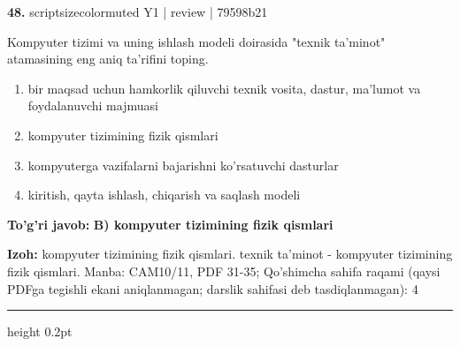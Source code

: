 \documentclass[10pt,a4paper]{article}
\begin{document}
{\bfseries\sffamily\color{ink} 48.} {scriptsizecolor{muted} Y1 | review | 79598b21}
\par
Kompyuter tizimi va uning ishlash modeli doirasida "texnik ta'minot" atamasining eng aniq ta'rifini toping.
\begin{enumerate}[label=\Alph*),leftmargin=9mm]
\item bir maqsad uchun hamkorlik qiluvchi texnik vosita, dastur, ma'lumot va foydalanuvchi majmuasi
\item kompyuter tizimining fizik qismlari
\item kompyuterga vazifalarni bajarishni ko'rsatuvchi dasturlar
\item kiritish, qayta ishlash, chiqarish va saqlash modeli
\end{enumerate}
\begin{tcolorbox}[enhanced,breakable,colback=teal!4,colframe=teal!60!black,boxrule=0.45pt,arc=1.2mm,left=2.7mm,right=2.7mm,top=1.8mm,bottom=1.8mm,before skip=2mm,after skip=2mm]
{\bfseries\sffamily\color{teal}To'g'ri javob:} \textbf{B) kompyuter tizimining fizik qismlari}
\par\smallskip
{\bfseries Izoh:} kompyuter tizimining fizik qismlari. texnik ta'minot - kompyuter tizimining fizik qismlari. Manba: CAM10/11, PDF 31-35; Qo'shimcha sahifa raqami (qaysi PDFga tegishli ekani aniqlanmagan; darslik sahifasi deb tasdiqlanmagan): 4
\end{tcolorbox}
\vspace{2mm}\hrule height 0.2pt\vspace{3mm}
\end{document}
